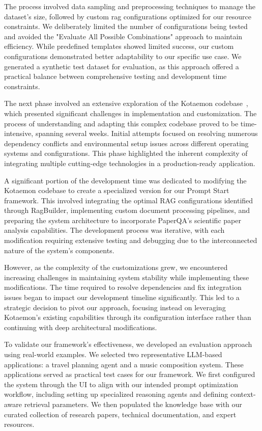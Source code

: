 \documentclass[12pt,twoside,english]{article}
\begin{document}
The process involved data sampling and preprocessing techniques to manage the dataset's size, followed by custom \gls{rag} configurations optimized for our resource constraints. We deliberately limited the number of configurations being tested and avoided the "Evaluate All Possible Combinations" approach to maintain efficiency. While predefined templates showed limited success, our custom configurations demonstrated better adaptability to our specific use case. We generated a synthetic test dataset for evaluation, as this approach offered a practical balance between comprehensive testing and development time constraints. 

The next phase involved an extensive exploration of the Kotaemon codebase~\cite{Cinnamon2024Kotaemon}, which presented significant challenges in implementation and customization. The process of understanding and adapting this complex codebase proved to be time-intensive, spanning several weeks. Initial attempts focused on resolving numerous dependency conflicts and environmental setup issues across different operating systems and configurations. This phase highlighted the inherent complexity of integrating multiple cutting-edge technologies in a production-ready application.

A significant portion of the development time was dedicated to modifying the Kotaemon codebase to create a specialized version for our Prompt Start framework. This involved integrating the optimal RAG configurations identified through RagBuilder, implementing custom document processing pipelines, and preparing the system architecture to incorporate PaperQA's scientific paper analysis capabilities. The development process was iterative, with each modification requiring extensive testing and debugging due to the interconnected nature of the system's components.

However, as the complexity of the customizations grew, we encountered increasing challenges in maintaining system stability while implementing these modifications. The time required to resolve dependencies and fix integration issues began to impact our development timeline significantly. This led to a strategic decision to pivot our approach, focusing instead on leveraging Kotaemon's existing capabilities through its configuration interface rather than continuing with deep architectural modifications.

To validate our framework's effectiveness, we developed an evaluation approach using real-world examples. We selected two representative LLM-based applications: a travel planning agent and a music composition system. These applications served as practical test cases for our framework. We first configured the system through the UI to align with our intended prompt optimization workflow, including setting up specialized reasoning agents and defining context-aware retrieval parameters. We then populated the knowledge base with our curated collection of research papers, technical documentation, and expert resources.
\end{document}
